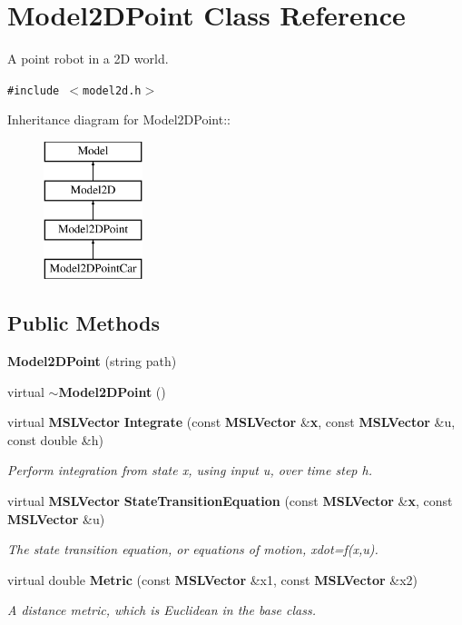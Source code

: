 \section{Model2DPoint  Class Reference}
\label{classModel2DPoint}
A point robot in a 2D world. 


{\tt \#include $<$model2d.h$>$}

Inheritance diagram for Model2DPoint::\begin{figure}[H]
\begin{center}
\leavevmode
\includegraphics[height=4cm]{classModel2DPoint}
\end{center}
\end{figure}
\subsection*{Public Methods}
\begin{CompactItemize}
\item 
{\bf Model2DPoint} (string path)
\item 
virtual {\bf $\sim$Model2DPoint} ()
\item 
virtual {\bf MSLVector} {\bf Integrate} (const {\bf MSLVector} \&{\bf x}, const {\bf MSLVector} \&u, const double \&h)
\begin{CompactList}\small\item\em Perform integration from state x, using input u, over time step h.\item\end{CompactList}\item 
virtual {\bf MSLVector} {\bf State\-Transition\-Equation} (const {\bf MSLVector} \&{\bf x}, const {\bf MSLVector} \&u)
\begin{CompactList}\small\item\em The state transition equation, or equations of motion, xdot=f(x,u).\item\end{CompactList}\item 
virtual double {\bf Metric} (const {\bf MSLVector} \&x1, const {\bf MSLVector} \&x2)
\begin{CompactList}\small\item\em A distance metric, which is Euclidean in the base class.\item\end{CompactList}\end{CompactItemize}


